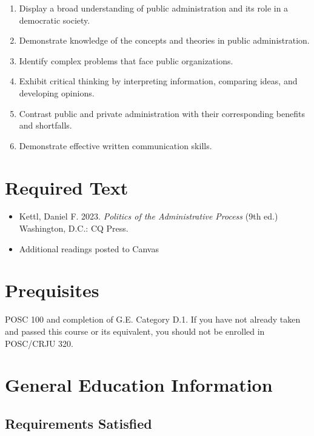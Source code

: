 \documentclass[11pt, letterpaper]{article}
\begin{document}
\begin{enumerate}
    \item Display a broad understanding of public administration and its role in a democratic society. 

    \item Demonstrate knowledge of the concepts and theories in public administration. 
    
    \item Identify complex problems that face public organizations.

    \item Exhibit critical thinking by interpreting information, comparing ideas, and developing opinions. 
    
    \item Contrast public and private administration with their corresponding benefits and shortfalls. 

    \item Demonstrate effective written communication skills. 

\end{enumerate}

\section{Required Text}

\begin{itemize}
    \item Kettl, Daniel F. 2023. \emph{Politics of the Administrative Process} (9th ed.) Washington, D.C.: CQ Press.
    \item Additional readings posted to Canvas
\end{itemize}

\section{Prequisites}

POSC 100 and completion of G.E. Category D.1.  If you have not already taken and passed this course or its equivalent, you should not be enrolled in POSC/CRJU 320.

\section{General Education Information}


\subsection*{Requirements Satisfied}
\end{document}
